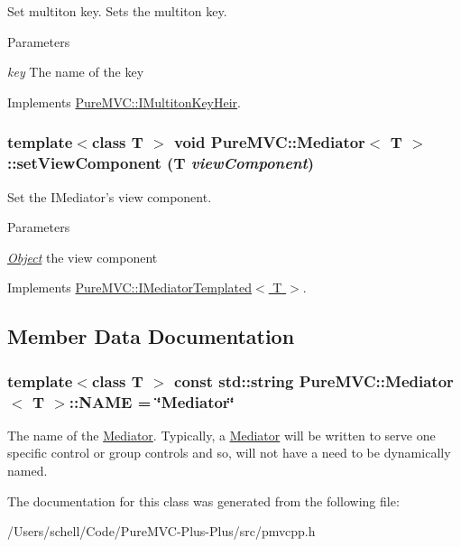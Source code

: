 Set multiton key. Sets the multiton key. 
\begin{DoxyParams}{Parameters}
\item[{\em key}]The name of the key \end{DoxyParams}


Implements \hyperlink{class_pure_m_v_c_1_1_i_multiton_key_heir_a03acb75ab79defba2c28b8de1bbe1ca6}{PureMVC::IMultitonKeyHeir}.\hypertarget{class_pure_m_v_c_1_1_mediator_a4af88fe9aee0b74198d3d9b73ffe7779}{
\subsubsection[{setViewComponent}]{\setlength{\rightskip}{0pt plus 5cm}template$<$class T $>$ void {\bf PureMVC::Mediator}$<$ T $>$::setViewComponent (T {\em viewComponent})}}
\label{class_pure_m_v_c_1_1_mediator_a4af88fe9aee0b74198d3d9b73ffe7779}


Set the {\ttfamily IMediator}'s view component. 
\begin{DoxyParams}{Parameters}
\item[{\em \hyperlink{class_pure_m_v_c_1_1_object}{Object}}]the view component \end{DoxyParams}


Implements \hyperlink{class_pure_m_v_c_1_1_i_mediator_templated_a0eb50a31925283b7d6cdfe5b9dc90163}{PureMVC::IMediatorTemplated$<$ T $>$}.

\subsection{Member Data Documentation}
\hypertarget{class_pure_m_v_c_1_1_mediator_a4d72ca6cdea700a24c5c4bff7b4c31ce}{
\subsubsection[{NAME}]{\setlength{\rightskip}{0pt plus 5cm}template$<$class T $>$ const std::string {\bf PureMVC::Mediator}$<$ T $>$::{\bf NAME} = \char`\"{}Mediator\char`\"{}}}
\label{class_pure_m_v_c_1_1_mediator_a4d72ca6cdea700a24c5c4bff7b4c31ce}


The name of the {\ttfamily \hyperlink{class_pure_m_v_c_1_1_mediator}{Mediator}}. Typically, a {\ttfamily \hyperlink{class_pure_m_v_c_1_1_mediator}{Mediator}} will be written to serve one specific control or group controls and so, will not have a need to be dynamically named. 

The documentation for this class was generated from the following file:\begin{DoxyCompactItemize}
\item 
/Users/schell/Code/PureMVC-\/Plus-\/Plus/src/pmvcpp.h\end{DoxyCompactItemize}
